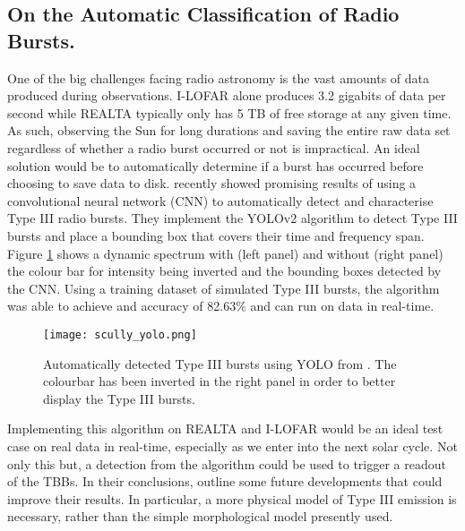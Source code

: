 \subsection{On the Automatic Classification of Radio Bursts.}
One of the big challenges facing radio astronomy is the vast amounts of data produced during observations. I-LOFAR alone produces 3.2 gigabits of data per second while REALTA typically only has 5 TB of free storage at any given time. As such, observing the Sun for long durations and saving the entire raw data set regardless of whether a radio burst occurred or not is impractical. An ideal solution would be to automatically determine if a burst has occurred before choosing to save data to disk. \cite{Scully2021} recently showed promising results of using a convolutional neural network (CNN) to automatically detect and characterise Type III radio bursts. They implement the YOLOv2 \citep[You Only Look Once;][]{Yolo9000} algorithm to detect Type III bursts and place a bounding box that covers their time and frequency span. Figure \ref{fig:yolo} shows a dynamic spectrum with (left panel) and without (right panel) the colour bar for intensity being inverted and the bounding boxes detected by the CNN. Using a training dataset of simulated Type III bursts, the algorithm was able to achieve and accuracy of 82.63$\%$ and can run on data in real-time.  

\begin{figure}[ht]
\centering
\texttt{[image: scully\_yolo.png]}
\caption[Automatically detected Type III bursts using YOLO]{Automatically detected Type III bursts using YOLO from \cite{Scully2021}. The colourbar has been inverted in the right panel in order to better display the Type III bursts. }
\label{fig:yolo}
\end{figure}

Implementing this algorithm on REALTA and I-LOFAR would be an ideal test case on real data in real-time, especially as we enter into the next solar cycle. Not only this but, a detection from the algorithm could be used to trigger a readout of the TBBs.
In their conclusions, \cite{Scully2021} outline some future developments that could improve their results. In particular, a more physical model of Type III emission is necessary, rather than the simple morphological model presently used.

